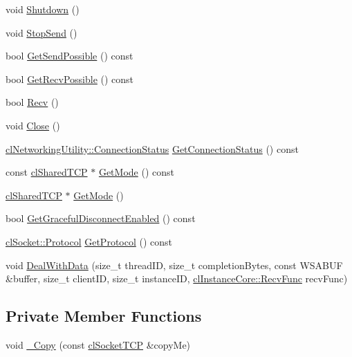 \begin{DoxyCompactItemize}
\item 
void \hyperlink{classcl_socket_t_c_p_a2be09cc6cfc5203a921722b9e833f03b}{Shutdown} ()
\item 
void \hyperlink{classcl_socket_t_c_p_abd106ce306134bb4e87c89bfbde267a4}{StopSend} ()
\item 
bool \hyperlink{classcl_socket_t_c_p_aa128c9f6045f2c040cb165ad9dba6a8e}{GetSendPossible} () const 
\item 
bool \hyperlink{classcl_socket_t_c_p_a6d57707357f916253e4f78099e5df36d}{GetRecvPossible} () const 
\item 
bool \hyperlink{classcl_socket_t_c_p_aaf5c2cebf6f2139dd84a85b8e95945df}{Recv} ()
\item 
void \hyperlink{classcl_socket_t_c_p_a8f1031669c4093bf2aacb788f97c1adf}{Close} ()
\item 
\hyperlink{classcl_networking_utility_a15dd34683154e07d5843f8f5432fec6d}{clNetworkingUtility::ConnectionStatus} \hyperlink{classcl_socket_t_c_p_a8076fc92db377e9ece2fa23f01b97db2}{GetConnectionStatus} () const 
\item 
const \hyperlink{classcl_shared_t_c_p}{clSharedTCP} $\ast$ \hyperlink{classcl_socket_t_c_p_a2038e72fa1ee96c9d3d7f736b6838fbe}{GetMode} () const 
\item 
\hyperlink{classcl_shared_t_c_p}{clSharedTCP} $\ast$ \hyperlink{classcl_socket_t_c_p_ad75ea89e1ab738e56cac2ca193a2d78f}{GetMode} ()
\item 
bool \hyperlink{classcl_socket_t_c_p_a279e1f27a53c3eb8a6e2ac26647a8915}{GetGracefulDisconnectEnabled} () const 
\item 
\hyperlink{classcl_simple_socket_affcd3d22c1abba5d20a0ae93472c576d}{clSocket::Protocol} \hyperlink{classcl_socket_t_c_p_ad465fce0e99ce328cafe5c77cbc8cef9}{GetProtocol} () const 
\item 
void \hyperlink{classcl_socket_t_c_p_a1b168f8a28b7100d6b837201b766e05a}{DealWithData} (size\_\-t threadID, size\_\-t completionBytes, const WSABUF \&buffer, size\_\-t clientID, size\_\-t instanceID, \hyperlink{classcl_instance_core_afa96c2a2c0b26b6a9256b87798bf9587}{clInstanceCore::RecvFunc} recvFunc)
\end{DoxyCompactItemize}
\subsection*{Private Member Functions}
\begin{DoxyCompactItemize}
\item 
void \hyperlink{classcl_socket_t_c_p_afede37c796405c00079db93346316c79}{\_\-Copy} (const \hyperlink{classcl_socket_t_c_p}{clSocketTCP} \&copyMe)
\end{DoxyCompactItemize}
